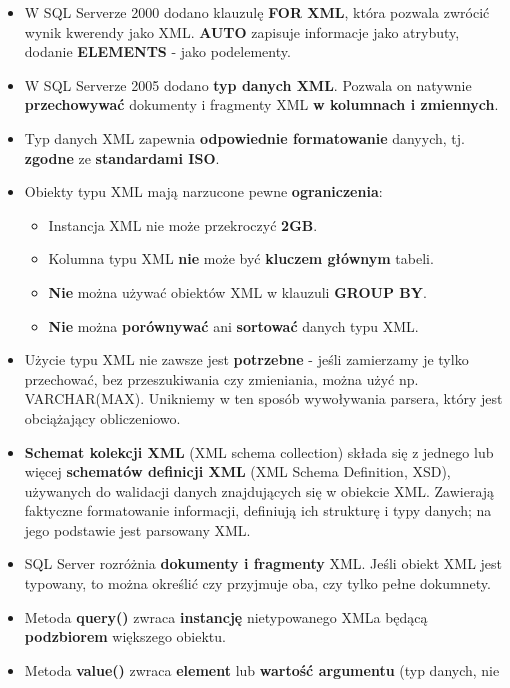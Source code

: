 \documentclass[a4paper]{article}
\begin{document}
    \begin{itemize}[noitemsep]
        \item W SQL Serverze 2000 dodano klauzulę \textbf{FOR XML}, która pozwala zwrócić wynik kwerendy jako XML.
        \textbf{AUTO} zapisuje informacje jako atrybuty, dodanie \textbf{ELEMENTS} - jako podelementy.
        \item W SQL Serverze 2005 dodano \textbf{typ danych XML}. Pozwala on natywnie \textbf{przechowywać} dokumenty i
        fragmenty XML \textbf{w kolumnach i zmiennych}.
        \item Typ danych XML zapewnia \textbf{odpowiednie formatowanie} danyych, tj. \textbf{zgodne} ze
        \textbf{standardami ISO}.
        \item Obiekty typu XML mają narzucone pewne \textbf{ograniczenia}:
        \begin{itemize}[noitemsep]
            \item Instancja XML nie może przekroczyć \textbf{2GB}.
            \item Kolumna typu XML \textbf{nie} może być \textbf{kluczem głównym} tabeli.
            \item \textbf{Nie} można używać obiektów XML w klauzuli \textbf{GROUP BY}.
            \item \textbf{Nie} można \textbf{porównywać} ani \textbf{sortować} danych typu XML.
        \end{itemize}
        \item Użycie typu XML nie zawsze jest \textbf{potrzebne} - jeśli zamierzamy je tylko przechować, bez
        przeszukiwania czy zmieniania, można użyć np. VARCHAR(MAX). Unikniemy w ten sposób wywoływania parsera, który
        jest obciążający obliczeniowo.
        \item \textbf{Schemat kolekcji XML} (XML schema collection) składa się z jednego lub więcej \textbf{schematów
        definicji XML} (XML Schema Definition, XSD), używanych do walidacji danych znajdujących się w obiekcie XML.
        Zawierają faktyczne formatowanie informacji, definiują ich strukturę i typy danych; na jego podstawie jest
        parsowany XML.
        \item SQL Server rozróżnia \textbf{dokumenty i fragmenty} XML. Jeśli obiekt XML jest typowany, to można określić
        czy przyjmuje oba, czy tylko pełne dokumnety.
        \item Metoda \textbf{query()} zwraca \textbf{instancję} nietypowanego XMLa będącą \textbf{podzbiorem}
        większego obiektu.
        \item Metoda \textbf{value()} zwraca \textbf{element} lub \textbf{wartość argumentu} (typ danych, nie

\end{itemize}
\end{document}
